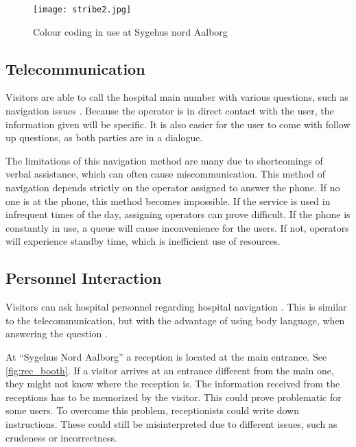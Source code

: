 \begin{figure}[htb]
  \begin{center} 
    \texttt{[image: stribe2.jpg]}
  \end{center}
  \caption{Colour coding in use at Sygehus nord Aalborg}
  \label{fig:colour_floor}
\end{figure}

\subsection{Telecommunication}\label{sub:pho}

Visitors are able to call the hospital main number with various questions, such as navigation issues \cite{sign_ring}. Because the operator is in direct contact with the user, the information given will be specific. It is also easier for the user to come with follow up questions, as both parties are in a dialogue.
 
The limitations of this navigation method are many due to shortcomings of verbal assistance, which can often cause miscommunication. This method of navigation depends strictly on the operator assigned to answer the phone. If no one is at the phone, this method becomes impossible.
If the service is used in infrequent times of the day, assigning operators can prove difficult. If the phone is constantly in use, a queue will cause inconvenience for the users. If not, operators will experience standby time, which is inefficient use of resources.

\subsection{Personnel Interaction}\label{sub:human}
Visitors can ask hospital personnel regarding hospital navigation \cite{job}. This is similar to the telecommunication, but with the advantage of using body language, when answering the question \cite{body_vs_phone}.

At \enquote{Sygehus Nord Aalborg} a reception is located at the main entrance. See \cref{fig:rec_booth}. If a visitor arrives at an entrance different from the main one, they might not know where the reception is. The information received from the receptions has to be memorized by the visitor. This could prove problematic for some users. To overcome this problem, receptionists could write down instructions. These could still be misinterpreted due to different issues, such as crudeness or incorrectness.

